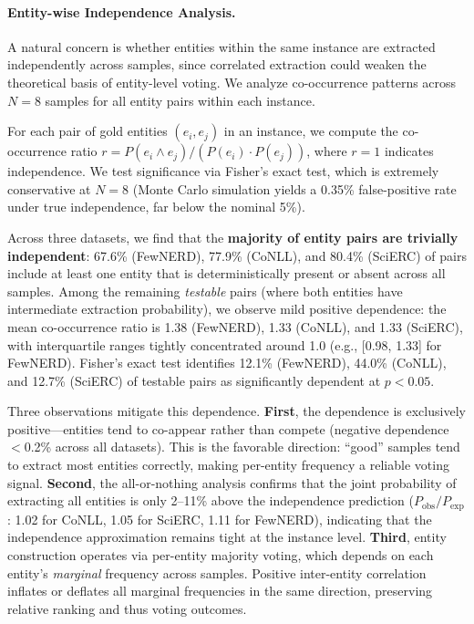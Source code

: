 
\paragraph{Entity-wise Independence Analysis.}
A natural concern is whether entities within the same instance are extracted independently across samples, since correlated extraction could weaken the theoretical basis of entity-level voting.
We analyze co-occurrence patterns across $N{=}8$ samples for all entity pairs within each instance.

For each pair of gold entities $(e_i, e_j)$ in an instance, we compute the co-occurrence ratio $r = P(e_i \wedge e_j) / (P(e_i) \cdot P(e_j))$, where $r{=}1$ indicates independence.
We test significance via Fisher's exact test, which is extremely conservative at $N{=}8$ (Monte Carlo simulation yields a 0.35\% false-positive rate under true independence, far below the nominal 5\%).

Across three datasets, we find that the \textbf{majority of entity pairs are trivially independent}: 67.6\% (FewNERD), 77.9\% (CoNLL), and 80.4\% (SciERC) of pairs include at least one entity that is deterministically present or absent across all samples.
Among the remaining \emph{testable} pairs (where both entities have intermediate extraction probability), we observe mild positive dependence: the mean co-occurrence ratio is 1.38 (FewNERD), 1.33 (CoNLL), and 1.33 (SciERC), with interquartile ranges tightly concentrated around 1.0 (e.g., [0.98, 1.33] for FewNERD).
Fisher's exact test identifies 12.1\% (FewNERD), 44.0\% (CoNLL), and 12.7\% (SciERC) of testable pairs as significantly dependent at $p < 0.05$.

Three observations mitigate this dependence.
\textbf{First}, the dependence is exclusively positive---entities tend to co-appear rather than compete (negative dependence $<$0.2\% across all datasets). This is the favorable direction: ``good'' samples tend to extract most entities correctly, making per-entity frequency a reliable voting signal.
\textbf{Second}, the all-or-nothing analysis confirms that the joint probability of extracting all entities is only 2--11\% above the independence prediction ($P_\text{obs}/P_\text{exp}$: 1.02 for CoNLL, 1.05 for SciERC, 1.11 for FewNERD), indicating that the independence approximation remains tight at the instance level.
\textbf{Third}, entity construction operates via per-entity majority voting, which depends on each entity's \emph{marginal} frequency across samples. Positive inter-entity correlation inflates or deflates all marginal frequencies in the same direction, preserving relative ranking and thus voting outcomes.
